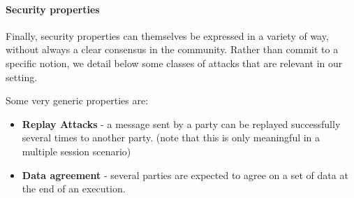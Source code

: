 \documentclass{article}
\begin{document}
\paragraph{Security properties}

Finally, security properties can themselves be expressed in a variety of way, without always a clear consensus in the community. Rather than commit to a specific notion, we detail below some classes of attacks that are relevant in our setting.

Some very generic properties are:
\begin{itemize}
\item \textbf{Replay Attacks} - a message sent by a party can be replayed successfully several times to another party. (note that this is only meaningful in a multiple session scenario)
\item \textbf{Data agreement} - several parties are expected to agree on a set of data at the end of an execution.
\end{itemize}
\end{document}

